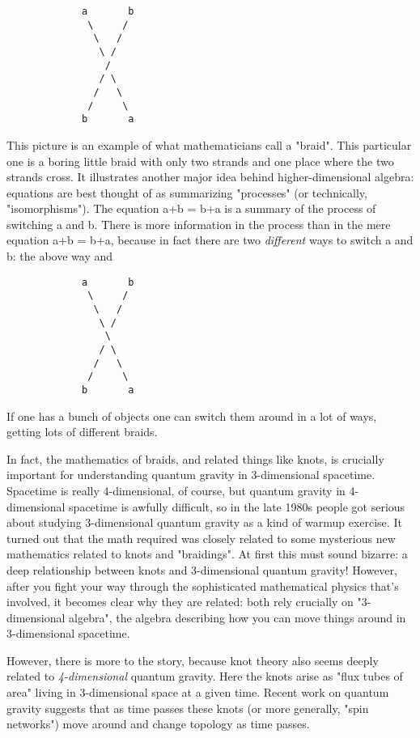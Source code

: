 \begin{verbatim}
             a       b
              \     /
               \   /
                \ /
                 /
                / \
               /   \
              /     \
             b       a

\end{verbatim}
    
This picture is an example of what mathematicians call a "braid".
This particular one is a boring little braid with only two strands and
one place where the two strands cross.  It illustrates another major
idea behind higher-dimensional algebra: equations are best thought of
as summarizing "processes" (or technically, "isomorphisms").  The
equation a+b = b+a is a summary of the process of switching a and b.
There is more information in the process than in the mere equation a+b
= b+a, because in fact there are two \emph{different} ways to switch a and
b: the above way and

\begin{verbatim}
             a       b
              \     /
               \   /
                \ /
                 \
                / \
               /   \
              /     \
             b       a

\end{verbatim}
    
If one has a bunch of objects one can switch them around in a lot
of ways, getting lots of different braids.  

In fact, the mathematics of braids, and related things like knots, is
crucially important for understanding quantum gravity in 3-dimensional
spacetime.  Spacetime is really 4-dimensional, of course, but quantum
gravity in 4-dimensional spacetime is awfully difficult, so in the
late 1980s people got serious about studying 3-dimensional quantum
gravity as a kind of warmup exercise.  It turned out that the math
required was closely related to some mysterious new mathematics
related to knots and "braidings".  At first this must sound bizarre: a
deep relationship between knots and 3-dimensional quantum gravity!
However, after you fight your way through the sophisticated
mathematical physics that's involved, it becomes clear why they are
related: both rely crucially on "3-dimensional algebra", the algebra
describing how you can move things around in 3-dimensional spacetime.


However, there is more to the story, because knot theory also seems
deeply related to \emph{4-dimensional} quantum gravity.  Here the
knots arise as "flux tubes of area" living in 3-dimensional
space at a given time.  Recent work on quantum gravity suggests that as
time passes these knots (or more generally, "spin networks")
move around and change topology as time passes.

